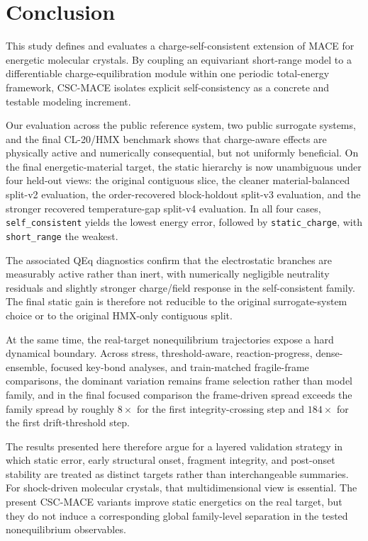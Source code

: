 \section{Conclusion}
\label{sec:conclusion}

This study defines and evaluates a charge-self-consistent extension of MACE for energetic molecular crystals. By coupling an equivariant short-range model to a differentiable charge-equilibration module within one periodic total-energy framework, CSC-MACE isolates explicit self-consistency as a concrete and testable modeling increment.

Our evaluation across the public reference system, two public surrogate systems, and the final CL-20/HMX benchmark shows that charge-aware effects are physically active and numerically consequential, but not uniformly beneficial. On the final energetic-material target, the static hierarchy is now unambiguous under four held-out views: the original contiguous slice, the cleaner material-balanced split-v2 evaluation, the order-recovered block-holdout split-v3 evaluation, and the stronger recovered temperature-gap split-v4 evaluation. In all four cases, \texttt{self\_consistent} yields the lowest energy error, followed by \texttt{static\_charge}, with \texttt{short\_range} the weakest.

The associated QEq diagnostics confirm that the electrostatic branches are measurably active rather than inert, with numerically negligible neutrality residuals and slightly stronger charge/field response in the self-consistent family. The final static gain is therefore not reducible to the original surrogate-system choice or to the original HMX-only contiguous split.

At the same time, the real-target nonequilibrium trajectories expose a hard dynamical boundary. Across stress, threshold-aware, reaction-progress, dense-ensemble, focused key-bond analyses, and train-matched fragile-frame comparisons, the dominant variation remains frame selection rather than model family, and in the final focused comparison the frame-driven spread exceeds the family spread by roughly $8\times$ for the first integrity-crossing step and $184\times$ for the first drift-threshold step.

The results presented here therefore argue for a layered validation strategy in which static error, early structural onset, fragment integrity, and post-onset stability are treated as distinct targets rather than interchangeable summaries. For shock-driven molecular crystals, that multidimensional view is essential. The present CSC-MACE variants improve static energetics on the real target, but they do not induce a corresponding global family-level separation in the tested nonequilibrium observables.


